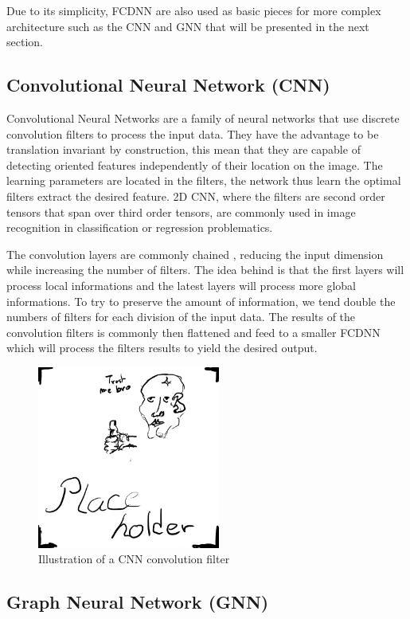 Due to its simplicity, FCDNN are also used as basic pieces for more complex architecture such as the CNN and GNN that will be presented in the next section.

\subsection{Convolutional Neural Network (CNN)}

Convolutional Neural Networks are a family of neural networks that use discrete convolution filters to process the input data. They have the advantage to be translation invariant by construction, this mean that they are capable of detecting oriented features independently of their location on the image. The learning parameters are located in the filters, the network thus learn the optimal filters extract the desired feature. 2D CNN, where the filters are second order tensors that span over third order tensors, are commonly used in image recognition \cite{russakovsky_imagenet_2015} in classification or regression problematics.

The convolution layers are commonly chained \cite{simonyan_very_2015}, reducing the input dimension while increasing the number of filters. The idea behind is that the first layers will process local informations and the latest layers will process more global informations. To try to preserve the amount of information, we tend double the numbers of filters for each division of the input data.
The results of the convolution filters is commonly then flattened and feed to a smaller FCDNN which will process the filters results to yield the desired output.

\begin{figure}[ht]
  \centering
  \includegraphics[height=6cm]{images/placeholder.jpg}
  \caption{Illustration of a CNN convolution filter}
\end{figure}

\subsection{Graph Neural Network (GNN)}

